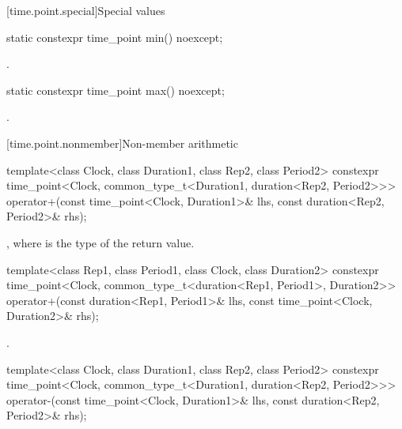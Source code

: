[time.point.special]{Special values}

%
\begin{itemdecl}
static constexpr time_point min() noexcept;
\end{itemdecl}

\begin{itemdescr}
\pnum
\returns
{}.
\end{itemdescr}

%
\begin{itemdecl}
static constexpr time_point max() noexcept;
\end{itemdecl}

\begin{itemdescr}
\pnum
\returns
{}.
\end{itemdescr}

[time.point.nonmember]{Non-member arithmetic}

%
%
\begin{itemdecl}
template<class Clock, class Duration1, class Rep2, class Period2>
  constexpr time_point<Clock, common_type_t<Duration1, duration<Rep2, Period2>>>
    operator+(const time_point<Clock, Duration1>& lhs, const duration<Rep2, Period2>& rhs);
\end{itemdecl}

\begin{itemdescr}
\pnum
\returns
{}, where  is the type of the return value.
\end{itemdescr}

%
%
\begin{itemdecl}
template<class Rep1, class Period1, class Clock, class Duration2>
  constexpr time_point<Clock, common_type_t<duration<Rep1, Period1>, Duration2>>
    operator+(const duration<Rep1, Period1>& lhs, const time_point<Clock, Duration2>& rhs);
\end{itemdecl}

\begin{itemdescr}
\pnum
\returns
{}.
\end{itemdescr}

%
%
\begin{itemdecl}
template<class Clock, class Duration1, class Rep2, class Period2>
  constexpr time_point<Clock, common_type_t<Duration1, duration<Rep2, Period2>>>
    operator-(const time_point<Clock, Duration1>& lhs, const duration<Rep2, Period2>& rhs);
\end{itemdecl}

